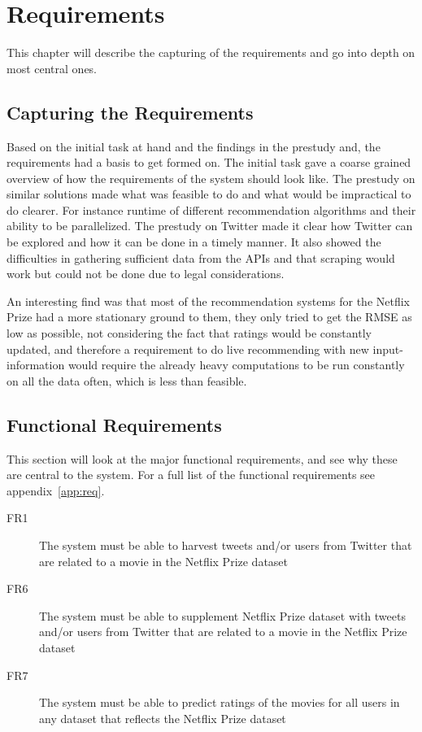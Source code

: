 
\chapter{Requirements}

\minitoc

This chapter will describe the capturing of the requirements and go into depth on most central ones.

\clearpage

\section{Capturing the Requirements}
Based on the initial task at hand and the findings in the prestudy and, the requirements had a basis to get formed on. The initial task gave a coarse grained overview of how the requirements of the system should look like. The prestudy on similar solutions made what was feasible to do and what would be impractical to do clearer. For instance runtime of different recommendation algorithms and their ability to be parallelized. The prestudy on Twitter made it clear how Twitter can be explored and how it can be done in a timely manner. It also showed the difficulties in gathering sufficient data from the APIs and that scraping would work but could not be done due to legal considerations.

An interesting find was that most of the recommendation systems for the Netflix Prize had a more stationary ground to them, they only tried to get the RMSE as low as possible, not considering the fact that ratings would be constantly updated, and therefore a requirement to do live recommending with new input-information would require the already heavy computations to be run constantly on all the data often, which is less than feasible.


\section{Functional Requirements}\label{section:functional-requirements}
This section will look at the major functional requirements, and see why these are central to the system. For a full list of the functional requirements see appendix~\ref{app:req}.
\begin{description}
  \item[FR1] The system must be able to harvest tweets and/or users from Twitter that are related to a movie in the Netflix Prize dataset
  \item[FR6] The system must be able to supplement Netflix Prize dataset with tweets and/or users from Twitter that are related to a movie in the Netflix Prize dataset
  \item[FR7] The system must be able to predict ratings of the movies for all users in any dataset that reflects the Netflix Prize dataset
\end{description}

